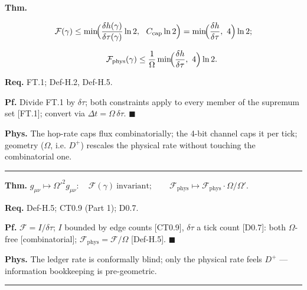 \begin{theorem}\label{tag:FT-5}
\textbf{Thm.}

\[
\mathcal F(\gamma)\le\min\!\Bigl(\frac{\delta h(\gamma)}{\delta\tau(\gamma)}\ln2,\ \ C_{\mathrm{cap}}\ln2\Bigr)=\min\!\Bigl(\frac{\delta h}{\delta\tau},\ 4\Bigr)\ln2;
\]

\[
\qquad \mathcal F_{\mathrm{phys}}(\gamma)\le\frac{1}{\Omega}\min\!\Bigl(\frac{\delta h}{\delta\tau},\ 4\Bigr)\ln2 .
\]

\textbf{Req.} FT.1; Def-H.2, Def-H.5.

\textbf{Pf.} Divide FT.1 by $\delta\tau$; both constraints apply to every member of the supremum set [FT.1]; convert via $\Delta t=\Omega\,\delta\tau$. $\blacksquare$

\textbf{Phys.} The hop-rate caps flux combinatorially; the 4-bit channel caps it per tick; geometry ($\Omega$, i.e. $D^+$) rescales the physical rate without touching the combinatorial one.

\vspace{2pt}\noindent\rule{\textwidth}{0.4pt}\vspace{2pt}

\end{theorem}

\begin{theorem}\label{tag:FT-6}
\textbf{Thm.} $g_{\mu\nu}\mapsto\Omega'^2g_{\mu\nu}:\quad\mathcal F(\gamma)\ \text{invariant};\qquad\mathcal F_{\mathrm{phys}}\mapsto\mathcal F_{\mathrm{phys}}\cdot\Omega/\Omega'.$

\textbf{Req.} Def-H.5; CT0.9 (Part 1); D0.7.

\textbf{Pf.} $\mathcal F=I/\delta\tau$; $I$ bounded by edge counts [CT0.9], $\delta\tau$ a tick count [D0.7]: both $\Omega$-free [combinatorial]; $\mathcal F_{\mathrm{phys}}=\mathcal F/\Omega$ [Def-H.5]. $\blacksquare$

\textbf{Phys.} The ledger rate is conformally blind; only the physical rate feels $D^+$ — information bookkeeping is pre-geometric.

\vspace{2pt}\noindent\rule{\textwidth}{0.4pt}\vspace{2pt}

\end{theorem}


